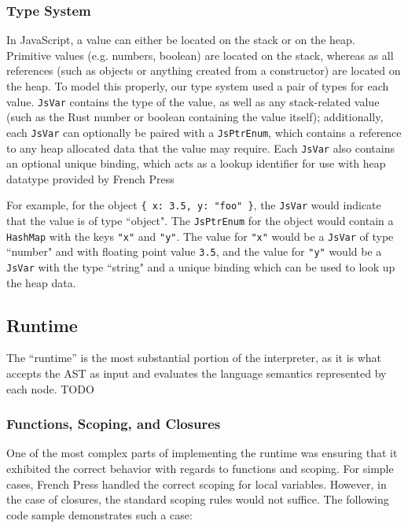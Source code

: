 \documentclass{article}
\begin{document}
\begin{multicols}{2}
\subsubsection*{Type System}

In JavaScript, a value can either be located on the stack or on the heap.
Primitive values (e.g. numbers, boolean) are located on the stack, whereas as
all references (such as objects or anything created from a constructor) are
located on the heap. To model this properly, our type system used a pair of
types for each value. \texttt{JsVar} contains the type of the value, as well as
any stack-related value (such as the Rust number or boolean containing the
value itself); additionally, each \texttt{JsVar} can optionally be paired with a
\texttt{JsPtrEnum}, which contains a reference to any heap allocated data that
the value may require. Each \texttt{JsVar} also contains an optional unique
binding, which acts as a lookup identifier for use with heap datatype provided
by French Press \newline

For example, for the object \texttt{\{ x: 3.5, y: "foo" \}}, the \texttt{JsVar}
would indicate that the value is of type ``object". The \texttt{JsPtrEnum} for
the object would contain a \texttt{HashMap} with the keys \texttt{"x"} and
\texttt{"y"}. The value for \texttt{"x"} would be a \texttt{JsVar} of type
``number" and with floating point value \texttt{3.5}, and the value for
\texttt{"y"} would be a \texttt{JsVar} with the type ``string" and a unique
binding which can be used to look up the heap data.

\subsection{Runtime}

The ``runtime'' is the most substantial portion of the interpreter, as it is
what accepts the AST as input and evaluates the language semantics represented
by each node. TODO

\subsubsection*{Functions, Scoping, and Closures}

One of the most complex parts of implementing the runtime was ensuring that it
exhibited the correct behavior with regards to functions and scoping. For simple
cases, French Press handled the correct scoping for local variables. However,
in the case of closures, the standard scoping rules would not suffice. The
following code sample demonstrates such a case:


\end{multicols}
\end{document}
